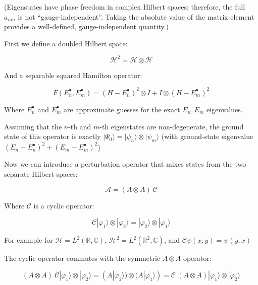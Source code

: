\documentclass{article}
\theoremstyle{definition}
\begin{document}
(Eigenstates have phase freedom in complex Hilbert spaces; therefore, the full $a_{nm}$ is not ``gauge-independent''. Taking the absolute value of the matrix element provides a well-defined, gauge-independent quantity.)

First we define a doubled Hilbert space:

\begin{equation}
\mathcal{H}^2 = \mathcal{H} \otimes \mathcal{H}
\end{equation}

And a separable squared Hamilton operator:

\begin{equation}
F(E_n^\bullet,E_m^\bullet) = (H-E_n^\bullet)^2 \otimes I + I \otimes (H-E_m^\bullet)^2
\end{equation}

Where $E_n^\bullet$ and $E_m^\bullet$ are approximate guesses for the exact $E_n, E_m$ eigenvalues.

Assuming that the $n$-th and $m$-th eigenstates are non-degenerate, the ground state of this operator is exactly $|\Psi_0\rangle = | \psi_n \rangle \otimes | \psi_m \rangle$ (with ground-state eigenvalue $(E_n-E_n^\bullet)^2+(E_m-E_m^\bullet)^2$)

Now we can introduce a perturbation operator that mixes states from the two separate Hilbert spaces:

\begin{equation}
\mathcal{A} = (A \otimes A) \ \mathcal{C}
\end{equation}

Where $\mathcal{C}$ is a cyclic operator:

\begin{equation}
\mathcal{C} |\varphi_1 \rangle \otimes |\varphi_2 \rangle
=
|\varphi_2 \rangle \otimes |\varphi_1 \rangle
\end{equation}

For example for $\mathcal{H}=L^2(\mathbb{R},\mathbb{C})$, $\mathcal{H}^2 = L^2(\mathbb{R}^2,\mathbb{C})$, and $\mathcal{C} \psi(x,y)= \psi(y,x)$

The cyclic operator commutes with the symmetric $A \otimes A$ operator:

\begin{equation}
(A \otimes A) \ \mathcal{C} |\varphi_1 \rangle \otimes |\varphi_2 \rangle
=
(A | \varphi_2 \rangle) \otimes (A | \varphi_1 \rangle)
=
\mathcal{C} \ (A \otimes A) |\varphi_1 \rangle \otimes |\varphi_2 \rangle
\end{equation}
\end{document}
